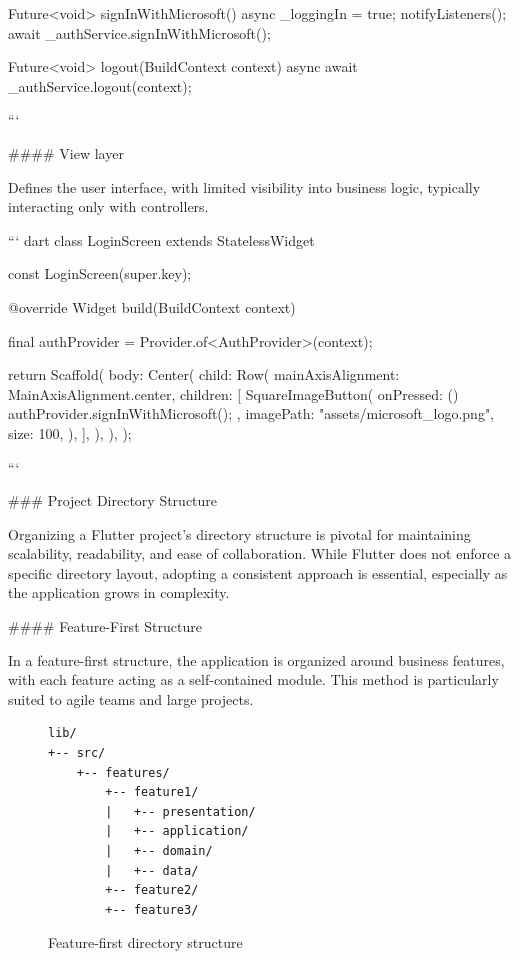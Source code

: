 \documentclass[
  digital,     %
  oneside,     %
  nosansbold,  %
  nocolorbold, %
  lof,         %
  lot,         %
]{fithesis4}
\begin{document}
\begin{markdown}
{  Future<void> signInWithMicrosoft() async {
    _loggingIn = true;
    notifyListeners();
    await _authService.signInWithMicrosoft();
  }

  Future<void> logout(BuildContext context) async {
    await _authService.logout(context);
  }
}
```

#### View layer

Defines the user interface, with limited visibility into business logic, typically interacting only with controllers.

``` dart
class LoginScreen extends StatelessWidget {
  const LoginScreen({super.key});

  @override
  Widget build(BuildContext context) {
    final authProvider = Provider.of<AuthProvider>(context);

    return Scaffold(
      body: Center(
        child: Row(
          mainAxisAlignment: MainAxisAlignment.center,
          children: [
            SquareImageButton(
              onPressed: () {
                authProvider.signInWithMicrosoft();
              },
              imagePath: "assets/microsoft_logo.png",
              size: 100,
            ),
          ],
        ),
      ),
    );
  }
}
```

### Project Directory Structure

Organizing a Flutter project's directory structure is pivotal for maintaining scalability, readability, and ease of collaboration. While Flutter does not enforce a specific directory layout, adopting a consistent approach is essential, especially as the application grows in complexity.

#### Feature-First Structure

In a feature-first structure, the application is organized around business features, with each feature acting as a self-contained module.  
This method is particularly suited to agile teams and large projects.

\end{markdown}
\begin{figure}[ht]
  \begin{center}
    \begin{minipage}{.8\textwidth}
      \begin{verbatim}
lib/
+-- src/
    +-- features/
        +-- feature1/
        |   +-- presentation/
        |   +-- application/
        |   +-- domain/
        |   +-- data/
        +-- feature2/
        +-- feature3/
      \end{verbatim}
    \end{minipage}
  \end{center}
  \caption{Feature-first directory structure}
  \label{fig:project_directory_feature_first}
\end{figure}
\end{document}
